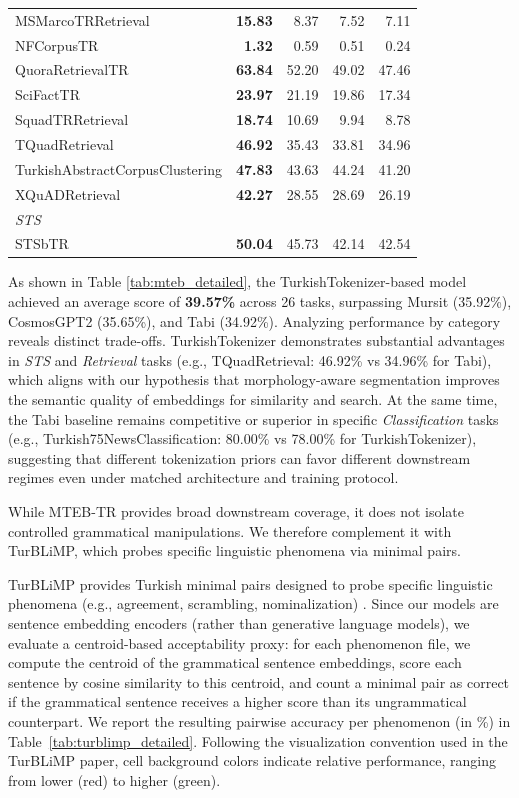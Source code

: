 \begin{table}[H]
{\begin{tabular}{lrrrr}
MSMarcoTRRetrieval & \textbf{15.83} & 8.37 & 7.52 & 7.11 \\
NFCorpusTR & \textbf{1.32} & 0.59 & 0.51 & 0.24 \\
QuoraRetrievalTR & \textbf{63.84} & 52.20 & 49.02 & 47.46 \\
SciFactTR & \textbf{23.97} & 21.19 & 19.86 & 17.34 \\
SquadTRRetrieval & \textbf{18.74} & 10.69 & 9.94 & 8.78 \\
TQuadRetrieval & \textbf{46.92} & 35.43 & 33.81 & 34.96 \\
TurkishAbstractCorpusClustering & \textbf{47.83} & 43.63 & 44.24 & 41.20 \\
XQuADRetrieval & \textbf{42.27} & 28.55 & 28.69 & 26.19 \\
\multicolumn{5}{l}{\textit{STS}} \\
STSbTR & \textbf{50.04} & 45.73 & 42.14 & 42.54 \\
\bottomrule
\end{tabular}
}
\end{table}

As shown in Table \ref{tab:mteb_detailed}, the TurkishTokenizer-based model achieved an average score of \textbf{39.57\%} across 26 tasks, surpassing Mursit (35.92\%), CosmosGPT2 (35.65\%), and Tabi (34.92\%). Analyzing performance by category reveals distinct trade-offs. TurkishTokenizer demonstrates substantial advantages in \textit{STS} and \textit{Retrieval} tasks (e.g., TQuadRetrieval: 46.92\% vs 34.96\% for Tabi), which aligns with our hypothesis that morphology-aware segmentation improves the semantic quality of embeddings for similarity and search. At the same time, the Tabi baseline remains competitive or superior in specific \textit{Classification} tasks (e.g., Turkish75NewsClassification: 80.00\% vs 78.00\% for TurkishTokenizer), suggesting that different tokenization priors can favor different downstream regimes even under matched architecture and training protocol.

While MTEB-TR provides broad downstream coverage, it does not isolate controlled grammatical manipulations. We therefore complement it with TurBLiMP, which probes specific linguistic phenomena via minimal pairs.


TurBLiMP provides Turkish minimal pairs designed to probe specific linguistic phenomena (e.g., agreement, scrambling, nominalization) \cite{basar_turblimp_2025}. Since our models are sentence embedding encoders (rather than generative language models), we evaluate a centroid-based acceptability proxy: for each phenomenon file, we compute the centroid of the grammatical sentence embeddings, score each sentence by cosine similarity to this centroid, and count a minimal pair as correct if the grammatical sentence receives a higher score than its ungrammatical counterpart. We report the resulting pairwise accuracy per phenomenon (in \%) in Table~\ref{tab:turblimp_detailed}. Following the visualization convention used in the TurBLiMP paper, cell background colors indicate relative performance, ranging from lower (red) to higher (green).

